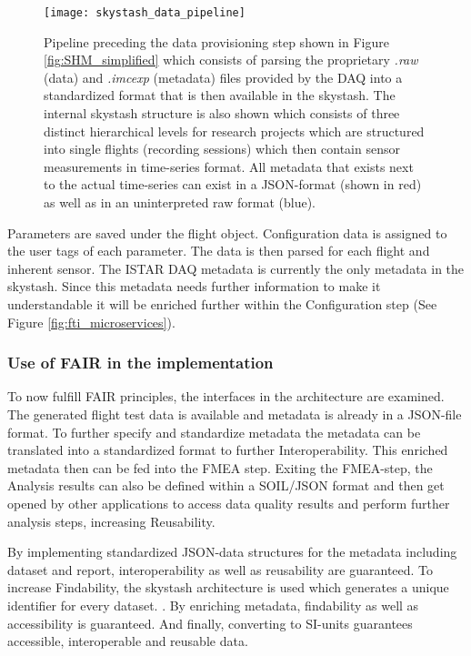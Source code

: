 \begin{figure}
    \centering
    \texttt{[image: skystash\_data\_pipeline]}
    \caption[FTI-Microservices: Data Provision]{Pipeline preceding the data provisioning step shown in Figure \ref{fig:SHM_simplified} which consists of parsing the proprietary \textit{.raw} (data) and \textit{.imcexp} (metadata) files provided by the DAQ into a standardized format that is then available in the skystash. The internal skystash structure is also shown which consists of three distinct hierarchical levels for research projects which are structured into single flights (recording sessions) which then contain sensor measurements in time-series format. All metadata that exists next to the actual time-series can exist in a JSON-format (shown in red) as well as in an uninterpreted raw format (blue).}
    \label{fig:skystash_data_pipeline}
\end{figure}

Parameters are saved under the flight object. Configuration data is assigned to the user tags of each parameter. The data is then parsed for each flight and inherent sensor. The ISTAR DAQ metadata is currently the only metadata in the skystash. Since this metadata needs further information to make it understandable it will be enriched further within the Configuration step (See Figure \ref{fig:fti_microservices}).

\subsubsection{Use of FAIR in the implementation}
To now fulfill FAIR principles, the interfaces in the architecture are examined. The generated flight test data is available and metadata is already in a JSON-file format. To further specify and standardize metadata the metadata can be translated into a standardized format to further Interoperability. This enriched metadata then can be fed into the FMEA step. Exiting the FMEA-step, the Analysis results can also be defined within a SOIL/JSON format and then get opened by other applications to access data quality results and perform further analysis steps, increasing Reusability.


By implementing standardized JSON-data structures for the metadata including dataset and report, interoperability as well as reusability are guaranteed. To increase Findability, the skystash architecture is used which generates a unique identifier for every dataset. \cite{meyer_development_2020}. By enriching metadata, findability as well as accessibility is guaranteed. And finally, converting to SI-units guarantees accessible, interoperable and reusable data.

